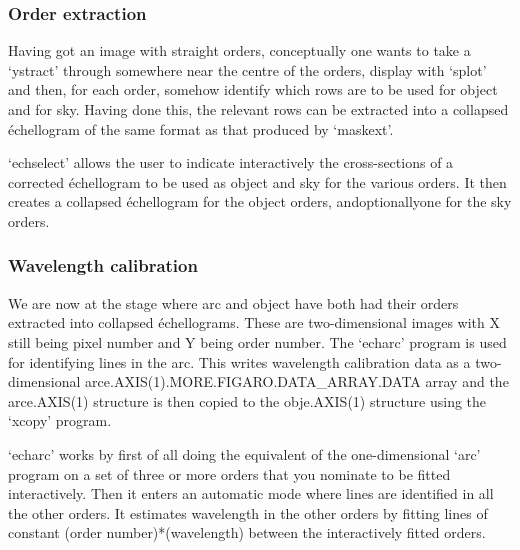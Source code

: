 
\subsubsection{Order extraction}

   Having got an image with straight orders, conceptually one wants to
   take a `ystract' through somewhere near the centre of the orders,
   display with `splot' and then, for each order, somehow identify which
   rows are to be used for object and for sky. Having done this, the
   relevant rows can be extracted into a collapsed \'echellogram of the
   same format as that produced by `maskext'.

   `echselect' allows the user to indicate interactively the
   cross-sections of a corrected \'echellogram to be used as object and
   sky for the various orders. It then creates a collapsed \'echellogram
   for the object orders, and\latorhtm{---}{-}optionally\latorhtm{---}{-}one
   for the sky orders.


\subsubsection{\label{techno13calib}Wavelength calibration}

\begin{latexonly}
\begin{figure}[htb]
\begin{center}
\leavevmode{}
\end{center}
\end{figure}
\end{latexonly}

   We are now at the stage where arc and object have both had their
   orders extracted into collapsed \'echellograms. These are
   two-dimensional images with X still being pixel number and Y being
   order number. The `echarc' program is used for identifying lines in
   the arc. This writes wavelength calibration data as a two-dimensional
   arce.\-AXIS(1).\-MORE.\-FIGARO.\-DATA\_\-ARRAY.\-DATA array and the
   arce.AXIS(1) structure is then copied to the obje.AXIS(1) structure
   using the `xcopy' program.

   `echarc' works by first of all doing the equivalent of the
   one-dimensional `arc' program on a set of three or more orders that
   you nominate to be fitted interactively. Then it enters an automatic
   mode where lines are identified in all the other orders. It estimates
   wavelength in the other orders by fitting lines of constant
   (order number)*(wavelength) between the interactively fitted orders.

